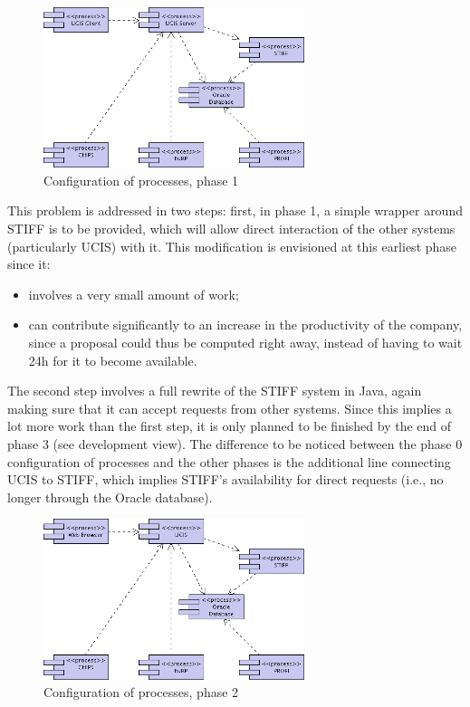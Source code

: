 \begin{figure}[ht]
\begin{center}
\includegraphics[width=3in]{img/cop_1.png}
\end{center}
\caption{Configuration of processes, phase 1}
\label{fig:cop_1}
\end{figure}

This problem is addressed in two steps: first, in phase 1, a simple wrapper around STIFF is
to be provided, which will allow direct interaction of the other systems (particularly UCIS)
with it. This modification is envisioned at this earliest phase since it:
\begin{itemize}
\item{involves a very small amount of work;}
\item{can contribute significantly to an increase in the productivity of the company, since a
proposal could thus be computed right away, instead of having to wait 24h for it to become
available.}
\end{itemize}

The second step involves a full rewrite of the STIFF system in Java, again making sure that
it can accept requests from other systems. Since this implies a lot more work than the first
step, it is only planned to be finished by the end of phase 3 (see development view). The
difference to be noticed between the phase 0 configuration of processes and the other phases
is the additional line connecting UCIS to STIFF, which implies STIFF's availability for direct
requests (i.e., no longer through the Oracle database).

\begin{figure}[ht]
\begin{center}
\includegraphics[width=3in]{img/cop_2.png}
\end{center}
\caption{Configuration of processes, phase 2}
\label{fig:cop_2}
\end{figure}

